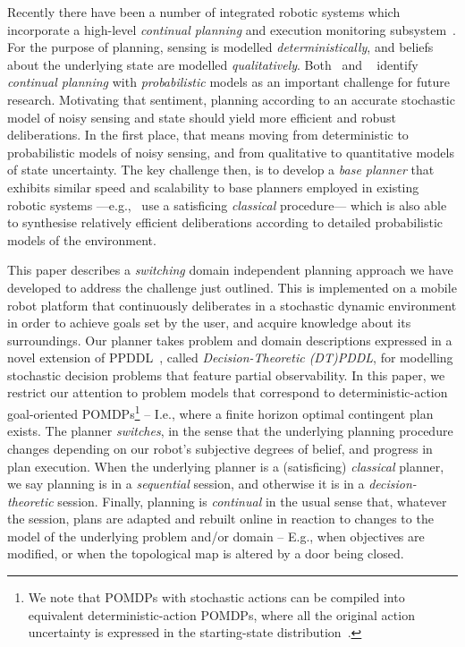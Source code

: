 



Recently there have been a number of integrated robotic systems which
incorporate a high-level {\em continual planning} and execution
monitoring
subsystem~\cite{wyattetal2010tamd,talamadupula:2010,Kraft2008}.
For the purpose of planning, sensing is modelled {\em
deterministically}, and beliefs about the underlying state are
modelled {\em qualitatively}.
Both~\citeauthor{talamadupula:2010} and
~\citeauthor{wyattetal2010tamd} identify
\emph{continual planning} with {\em probabilistic}
models as an important challenge for future research.
Motivating that sentiment, planning according to an accurate
stochastic model of noisy sensing and state should yield more
efficient and robust deliberations.
In the first place, that means moving from deterministic to
probabilistic models of noisy sensing, and from qualitative to
quantitative models of state uncertainty. The key challenge then, is
to develop a {\em base planner} that exhibits similar speed and
scalability to base planners employed in existing robotic systems
---e.g.,~\citeauthor{wyattetal2010tamd} use a satisficing {\em
classical} procedure--- which is also able to synthesise relatively
efficient deliberations according to detailed probabilistic models of
the environment.


This paper describes a {\em switching} domain independent planning
approach we have developed to address the challenge just
outlined. This is implemented on a mobile robot platform that
continuously deliberates in a stochastic dynamic environment in order
to achieve goals set by the user, and acquire knowledge about its
surroundings.
Our planner takes problem and domain descriptions expressed in a novel
extension of PPDDL~\cite{younes:etal:2005}, called {\em
Decision-Theoretic (DT)PDDL}, for modelling stochastic decision
problems that feature partial observability.  In this paper, we
restrict our attention to problem models that correspond to
deterministic-action goal-oriented POMDPs\footnote{We note that POMDPs
with stochastic actions can be compiled into equivalent
deterministic-action POMDPs, where all the original action uncertainty
is expressed in the starting-state
distribution~\cite{ng:Jordan:2000}.} -- I.e., where a finite horizon
optimal contingent plan exists.  The planner {\em switches}, in the
sense that the underlying planning procedure changes depending on our
robot's subjective degrees of belief, and progress in plan
execution. When the underlying planner is a (satisficing) {\em
classical} planner, we say planning is in a {\em sequential} session,
and otherwise it is in a {\em decision-theoretic} session. Finally,
planning is {\em continual} in the usual sense that, whatever the
session, plans are adapted and rebuilt online in reaction to changes
to the model of the underlying problem and/or domain -- E.g., when
objectives are modified, or when the topological map is altered by a
door being closed.


